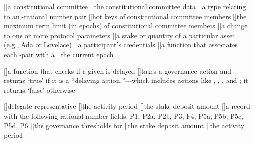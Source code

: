 [\protect{}]{a constitutional committee}
[\protect{}]{the constitutional committee data}
[\protect{}]{a type relating \KeyHash to an \Epoch-rational number pair}
[\protect{}]{hot keys of constitutional committee members}
[\protect{}]{the maximum term limit (in epochs) of constitutional committee members}
[\protect{}]{a change to one or more protocol parameters}
[\protect{}]{a stake or quantity of a particular asset (e.g., Ada or Lovelace)}
[\protect{}]{a participant's credentials}
[\protect{}]{a function that associates each \GovRole-\Credential pair with a \VDeleg}
[\protect{}]{the current epoch}

[\protect{}]{a function that checks if a given \GovAction is delayed}
[\protect{}]{takes a governance action and returns `true' if it is a ``delaying action,''---which includes actions like \NoConfidence, \NewCommittee, \NewConstitution, and \TriggerHF; it returns `false' otherwise}

[\protect{}]{delegate representative}
[\protect{}]{the \DRep activity period}
[\protect{}]{the \DRep stake deposit amount}
[\protect{}]{a record with the following rational number fields:
  \acs{P1}, \acs{P2a}, \acs{P2b}, \acs{P3}, \acs{P4}, \acs{P5a}, \acs{P5b},   \acs{P5c}, \acs{P5d}, \acs{P6}}
[\protect{}]{the governance thresholds for \DReps}
[\protect{}]{the \DRep stake deposit amount}
[\protect{}]{the \DRep activity period}

